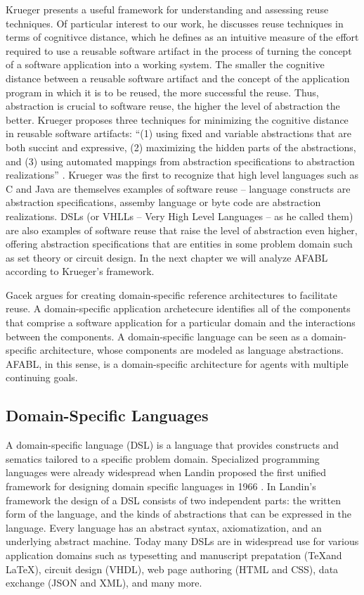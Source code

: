 Krueger presents a useful framework for understanding and assessing reuse techniques. Of particular interest to our work, he discusses reuse techniques in terms of cognitivce distance, which he defines as an intuitive measure of the effort required to use a reusable software artifact in the process of turning the concept of a software application into a working system. The smaller the cognitive distance between a reusable software artifact and the concept of the application program in which it is to be reused, the more successful the reuse. Thus, abstraction is crucial to software reuse, the higher the level of abstraction the better. Krueger proposes three techniques for minimizing the cognitive distance in reusable software artifacts: ``(1) using fixed and variable abstractions that are both succint and expressive, (2) maximizing the hidden parts of the abstractions, and (3) using automated mappings from abstraction specifications to abstraction realizations'' \cite{krueger1992a-software}. Krueger was the first to recognize that high level languages such as C and Java are themselves examples of software reuse -- language constructs are abstraction specifications, assemby language or byte code are abstraction realizations. DSLs (or VHLLs -- Very High Level Languages -- as he called them) are also examples of software reuse that raise the level of abstraction even higher, offering abstraction specifications that are entities in some problem domain such as set theory or circuit design. In the next chapter we will analyze AFABL according to Krueger's framework.

Gacek argues for creating domain-specific reference architectures to facilitate reuse\cite{gacek1995a-exploiting}. A domain-specific application archetecure identifies all of the components that comprise a software application for a particular domain and the interactions between the components. A domain-specific language can be seen as a domain-specific architecture, whose components are modeled as language abstractions. AFABL, in this sense, is a domain-specific architecture for agents with multiple continuing goals.

\subsection{Domain-Specific Languages}

A domain-specific language (DSL) is a language that provides constructs and sematics tailored to a specific problem domain. Specialized programming languages were already widespread when Landin proposed the first unified framework for designing domain specific languages in 1966 \cite{landin1966next}. In Landin's framework the design of a DSL consists of two independent parts: the written form of the language, and the kinds of abstractions that can be expressed in the language. Every language has an abstract syntax, axiomatization, and an underlying abstract machine. Today many DSLs are in widespread use for various application domains such as typesetting and manuscript prepatation (\TeX and \LaTeX), circuit design (VHDL), web page authoring (HTML and CSS), data exchange (JSON and XML), and many more.

